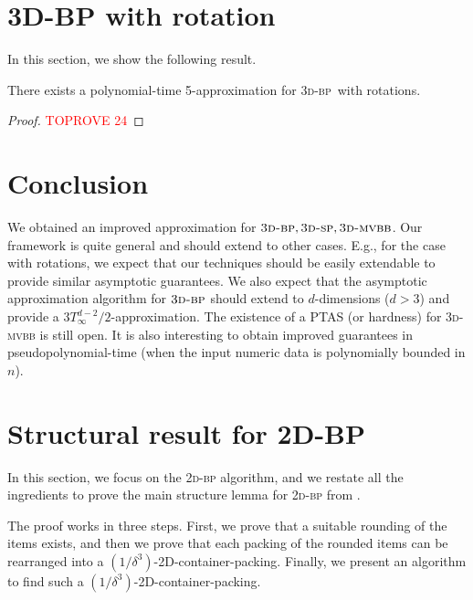 \documentclass[a4paper,UKenglish,cleveref, autoref, thm-restate]{lipics-v2021}
\newcommand{\twobp}{\textsc{2d-bp}\xspace}
\newcommand{\tbp}{\textsc{3d-bp}\xspace}
\newcommand{\tsp}{\textsc{3d-sp}\xspace}
\newcommand{\tmvc}{\textsc{3d-mvbb}\xspace}
\begin{document}
\section{3D-BP with rotation}
\label{sec:rotation}



In this section, we show the following result.

\begin{theorem}
    There exists a polynomial-time 5-approximation for \tbp~with rotations.
\end{theorem}
\begin{proof}\textcolor{red}{TOPROVE 24}\end{proof}

\section{Conclusion}
\label{sec:conc}
We obtained an improved approximation for $\tbp, \tsp, \tmvc$.
Our framework is quite general and should extend to other cases.
E.g., for the case with rotations, we expect that our techniques should be easily extendable to provide similar asymptotic guarantees. 
We also expect that the asymptotic approximation algorithm for $\tbp$  should extend to $d$-dimensions ($d>3$) and provide a $3T_{\infty}^{d-2}/2$-approximation. 
The existence of a PTAS (or hardness) for \tmvc is still open. 
It is also interesting to obtain improved guarantees in pseudopolynomial-time (when the input numeric data is polynomially bounded in $n$).


\appendix




















\section{Structural result for 2D-BP}
\label{subsec:2dbpAppndix}
In this section, we focus on the \twobp algorithm, and we restate all the ingredients to prove the main structure lemma for \twobp from \cite{jansen2016new}.

\twoBPStructure*

The proof works in three steps. First, we prove that a suitable rounding of the items exists, and then we prove that each packing of the rounded items can be rearranged into a $(1/\delta^3)$-2D-container-packing. Finally, we present an algorithm to find such a $(1/\delta^3)$-2D-container-packing.
\end{document}
